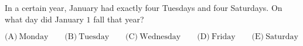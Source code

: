 

In a certain year, January had exactly four Tuesdays and four Saturdays. On what day did January $1$ fall that year?

$\text{(A)}\ \text{Monday} \qquad \text{(B)}\ \text{Tuesday} \qquad \text{(C)}\ \text{Wednesday} \qquad \text{(D)}\ \text{Friday} \qquad \text{(E)}\ \text{Saturday}$
